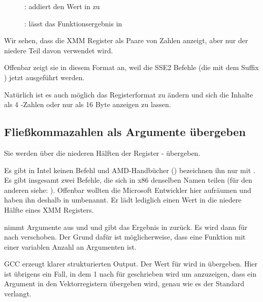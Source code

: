 \clearpage
\begin{figure}[H]
\centering
{}
\caption{\olly:  addiert den Wert in  zu }
\label{fig:FPU_SIMD_simple_olly4}
\end{figure}

\clearpage
\begin{figure}[H]
\centering
{}
\caption{\olly: \FLD lässt das Funktionsergebnis in }
\label{fig:FPU_SIMD_simple_olly5}
\end{figure}
Wir sehen, dass \olly die XMM Register als Paare von \Tdouble Zahlen anzeigt, aber nur der niedere Teil davon verwendet
wird.

Offenbar zeigt \olly sie in diesem Format an, weil die SSE2 Befehle (die mit dem Suffix ) jetzt ausgeführt
werden.

Natürlich ist es auch möglich das Registerformat zu ändern und sich die Inhalte als 4 \Tfloat-Zahlen oder nur als 16
Byte anzeigen zu lassen.

\clearpage
\subsection{Fließkommazahlen als Argumente übergeben}


Sie werden über die niederen Hälften der Register - übergeben.



Es gibt in Intel keinen  Befehl und AMD-Handbücher () bezeichnen ihn nur mit .
Es gibt insgesamt zwei Befehle, die sich in x86 denselben Namen teilen (für den anderen siehe: ).
Offenbar wollten die Microsoft Entwickler hier aufräumen und haben ihn deshalb in  umbenannt.
Er lädt lediglich einen Wert in die niedere Hälfte eines XMM Registers.

 nimmt Argumente aus  und  und gibt das Ergebnis in  zurück.
Es wird dann für \printf nach \RDX verschoben.
Der Grund dafür ist möglicherweise, dass \printf eine Funktion mit einer variablen Anzahl an Argumenten ist.


GCC erzeugt klarer strukturierten Output.
Der Wert für \printf wird in  übergeben.
Hier ist übrigens ein Fall, in dem 1 nach \EAX für \printf geschrieben wird um anzuzeigen, dass ein Argument in den
Vektorregistern übergeben wird, genau wie es der Standard \SysVABI verlangt.

